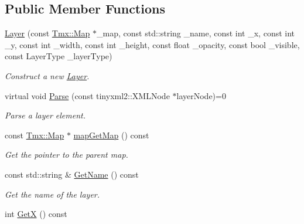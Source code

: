 \subsection*{Public Member Functions}
\begin{DoxyCompactItemize}
\item 
\hypertarget{classTmx_1_1Layer_a6984126fbda7aecb74f4a124740e8672}{\hyperlink{classTmx_1_1Layer_a6984126fbda7aecb74f4a124740e8672}{Layer} (const \hyperlink{classTmx_1_1Map}{Tmx\-::\-Map} $\ast$\-\_\-map, const std\-::string \-\_\-name, const int \-\_\-x, const int \-\_\-y, const int \-\_\-width, const int \-\_\-height, const float \-\_\-opacity, const bool \-\_\-visible, const Layer\-Type \-\_\-layer\-Type)}\label{classTmx_1_1Layer_a6984126fbda7aecb74f4a124740e8672}

\begin{DoxyCompactList}\small\item\em Construct a new \hyperlink{classTmx_1_1Layer}{Layer}. \end{DoxyCompactList}\item 
\hypertarget{classTmx_1_1Layer_adbc29ca32a7d2172f47787d93187401c}{virtual void \hyperlink{classTmx_1_1Layer_adbc29ca32a7d2172f47787d93187401c}{Parse} (const tinyxml2\-::\-X\-M\-L\-Node $\ast$layer\-Node)=0}\label{classTmx_1_1Layer_adbc29ca32a7d2172f47787d93187401c}

\begin{DoxyCompactList}\small\item\em Parse a layer element. \end{DoxyCompactList}\item 
\hypertarget{classTmx_1_1Layer_a88f85f9315074c6c57fedc9352ac326c}{const \hyperlink{classTmx_1_1Map}{Tmx\-::\-Map} $\ast$ \hyperlink{classTmx_1_1Layer_a88f85f9315074c6c57fedc9352ac326c}{map\-Get\-Map} () const }\label{classTmx_1_1Layer_a88f85f9315074c6c57fedc9352ac326c}

\begin{DoxyCompactList}\small\item\em Get the pointer to the parent map. \end{DoxyCompactList}\item 
\hypertarget{classTmx_1_1Layer_a3896ff18af7bf93d73f7a42cf7c34f14}{const std\-::string \& \hyperlink{classTmx_1_1Layer_a3896ff18af7bf93d73f7a42cf7c34f14}{Get\-Name} () const }\label{classTmx_1_1Layer_a3896ff18af7bf93d73f7a42cf7c34f14}

\begin{DoxyCompactList}\small\item\em Get the name of the layer. \end{DoxyCompactList}\item 
\hypertarget{classTmx_1_1Layer_afc3899eaffe2425ad31ea3035a34c2ca}{int \hyperlink{classTmx_1_1Layer_afc3899eaffe2425ad31ea3035a34c2ca}{Get\-X} () const }\label{classTmx_1_1Layer_afc3899eaffe2425ad31ea3035a34c2ca}


\end{DoxyCompactItemize}
